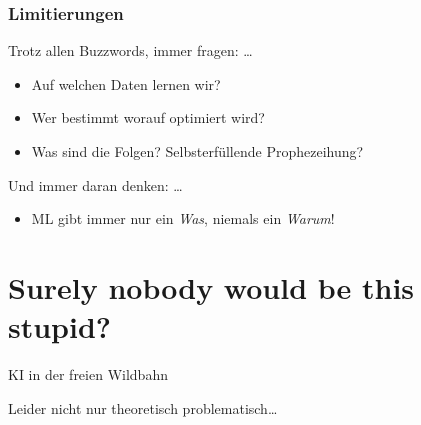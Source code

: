 \documentclass[aspectratio=43,x11names]{beamer}
\begin{document}
\begin{frame}
\frametitle{Limitierungen}

Trotz allen Buzzwords, immer fragen: \dots \bigskip

\begin{itemize}
\pause\item Auf welchen Daten lernen wir?\\

\pause\item Wer bestimmt worauf optimiert wird?\\

\pause\item Was sind die Folgen? Selbsterfüllende Prophezeihung?\\
\end{itemize}

\pause\bigskip

Und immer daran denken: \dots
\begin{itemize}
\item ML gibt immer nur ein \emph{Was}, niemals ein \emph{Warum}!
\end{itemize}
\end{frame}


\section{Surely nobody would be this stupid?}

\begin{frame}
\begin{center}
\huge
KI in der freien Wildbahn
\bigskip

\large
Leider nicht nur theoretisch problematisch\dots
\end{center}
\end{frame}
\end{document}
